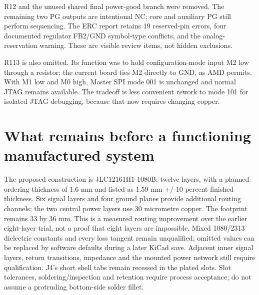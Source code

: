 \documentclass[10pt,a4paper]{article}
\begin{document}
R12 and the unused shared final power-good branch were removed. The remaining two PG outputs are intentional NC; core and auxiliary PG still perform sequencing. The ERC report retains 19 reserved-pin errors, four documented regulator FB2/GND symbol-type conflicts, and the analog-reservation warning. These are visible review items, not hidden exclusions.

R113 is also omitted. Its function was to hold configuration-mode input M2 low through a resistor; the current board ties M2 directly to GND, as AMD permits. With M1 low and M0 high, Master SPI mode 001 is unchanged and normal JTAG remains available. The tradeoff is less convenient rework to mode 101 for isolated JTAG debugging, because that now requires changing copper.
\section{What remains before a functioning manufactured system}
The proposed construction is JLC12161H1-1080B: twelve layers, with a planned ordering thickness of 1.6 mm and listed as 1.59 mm +/-10 percent finished thickness. Six signal layers and four ground planes provide additional routing channels; the two central power layers use 30 micrometre copper. The footprint remains 33 by 36 mm. This is a measured routing improvement over the earlier eight-layer trial, not a proof that eight layers are impossible. Mixed 1080/2313 dielectric constants and every loss tangent remain unqualified; omitted values can be replaced by software defaults during a later KiCad save. Adjacent inner signal layers, return transitions, impedance and the mounted power network still require qualification. J4's short shell tabs remain recessed in the plated slots. Slot tolerances, soldering/inspection and retention require process acceptance; do not assume a protruding bottom-side solder fillet.
\end{document}
